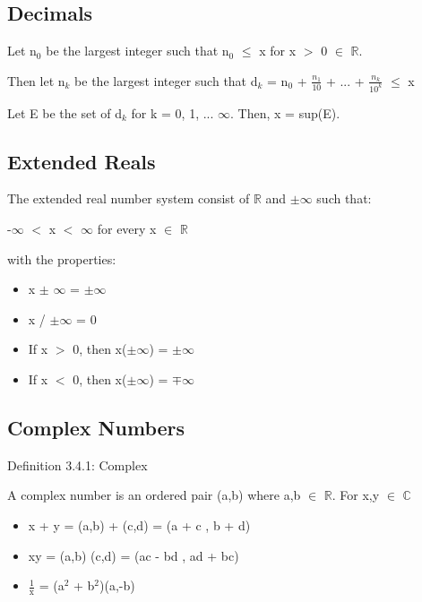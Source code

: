 	
\subsection{Decimals}

	Let n$_0$ be the largest integer such that n$_0$ $\leq$ x for
	x $>$ 0 $\in$ $\mathbb{R}$.

	Then let n$_k$ be the largest integer such that
	d$_k$ = n$_0$ + $\frac{n_1}{10}$ + ... + $\frac{n_k}{10^k}$ $\leq$ x

	Let E be the set of d$_k$ for k = 0, 1, ... $\infty$. Then, x = sup(E).





\subsection{Extended Reals}

	The extended real number system consist of $\mathbb{R}$
	and $\pm$$\infty$ such that:

	\hspace{1cm}
	-$\infty$ $<$ x $<$ $\infty$ \hspace{1cm} for every x $\in$ $\mathbb{R}$

	with the properties:
	\begin{itemize}[leftmargin=1cm, itemsep=0.1cm]
		\item x $\pm$ $\infty$ = $\pm$$\infty$
	
		\item x / $\pm$$\infty$ = 0

		\item If x $>$ 0, then x($\pm$$\infty$) = $\pm$$\infty$

		\item If x $<$ 0, then x($\pm$$\infty$) = $\mp$$\infty$
	\end{itemize}





\subsection{Complex Numbers}

{ \color{blue} Definition 3.4.1: Complex } 
	
	\hspace{1cm}
	A complex number is an ordered pair (a,b) where a,b $\in$ $ \mathbb{R} $.
	For x,y $\in$ $\mathbb{C}$

	\begin{itemize}[leftmargin=2cm, itemsep=0.1cm]
		\item x + y = (a,b) + (c,d) = (a + c , b + d)
		\item xy = (a,b) (c,d) = (ac - bd , ad + bc)
		\item $\frac{1}{\text{x}}$  = (a$^2$ + b$^2$)(a,-b)
	\end{itemize}

